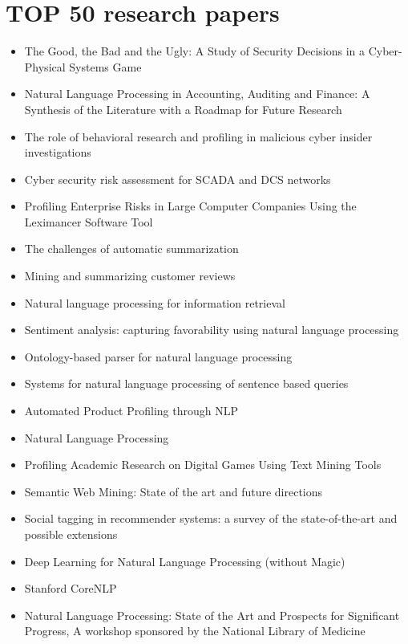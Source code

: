 \documentclass[9pt]{article}
\begin{document}
\section{TOP 50 research papers}
\begin{itemize}
\item The Good, the Bad and the Ugly: A Study of Security Decisions in a Cyber-Physical Systems Game \cite{DnD}
\item Natural Language Processing in Accounting, Auditing and Finance: A Synthesis of the Literature with a Roadmap for Future Research\cite{nlpfinance}
\item The role of behavioral research and profiling in malicious cyber insider investigations\cite{nlpinvestigation}
\item Cyber security risk assessment for SCADA and DCS networks \cite{risk assessment}
\item Profiling Enterprise Risks in Large Computer Companies Using the Leximancer Software Tool\cite{profiling risk}
\item The challenges of automatic summarization \cite{summarization}
\item Mining and summarizing customer reviews \cite{mining summarizing}
\item Natural language processing for information retrieval \cite{nlp info}
\item Sentiment analysis: capturing favorability using natural language processing \cite{nlpsentiment}
\item Ontology-based parser for natural language processing \cite{nlpparser}
\item Systems for natural language processing of sentence based queries \cite{nlpqueries}
\item Automated Product Profiling through NLP \cite{product profiling}
\item Natural Language Processing \cite{nlp2}
\item Profiling Academic Research on Digital Games Using Text Mining Tools \cite{games profiling}
\item Semantic Web Mining: State of the art and future directions \cite{web mining}
\item Social tagging in recommender systems: a survey of the state-of-the-art and possible extensions \cite{social tagging}
\item Deep Learning for Natural Language Processing (without Magic) \cite{tuto}
\item Stanford CoreNLP \cite{program}
\item Natural Language Processing: State of the Art and Prospects for Significant Progress, A workshop sponsored by the National Library of Medicine \cite{nlp sota medecine}

\end{itemize}
\end{document}
